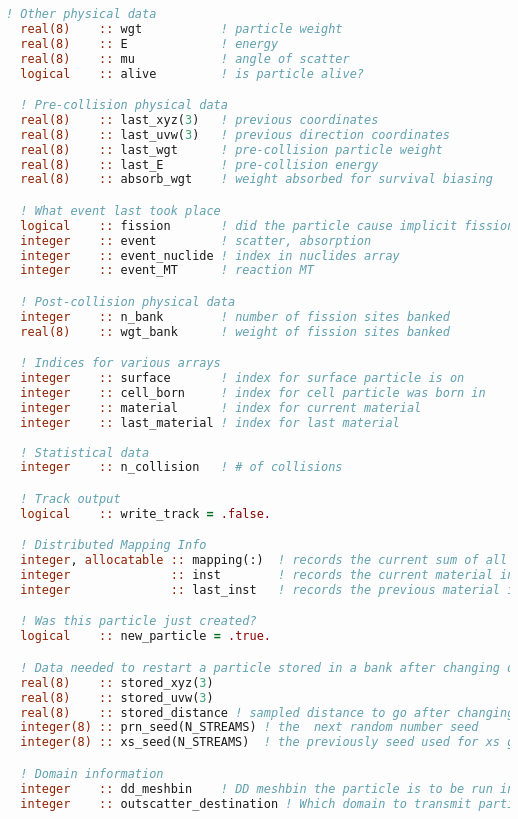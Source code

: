 \begin{appendices}
\begin{lstlisting}[language=Fortran, frame=none, keepspaces=true, frame=single, linewidth=6in, xleftmargin=0.0in,
caption={Full OpenMC particle data structure. \label{lst:particle}}]
  ! Other physical data
  real(8)    :: wgt           ! particle weight
  real(8)    :: E             ! energy
  real(8)    :: mu            ! angle of scatter
  logical    :: alive         ! is particle alive?

  ! Pre-collision physical data
  real(8)    :: last_xyz(3)   ! previous coordinates
  real(8)    :: last_uvw(3)   ! previous direction coordinates
  real(8)    :: last_wgt      ! pre-collision particle weight
  real(8)    :: last_E        ! pre-collision energy
  real(8)    :: absorb_wgt    ! weight absorbed for survival biasing

  ! What event last took place
  logical    :: fission       ! did the particle cause implicit fission
  integer    :: event         ! scatter, absorption
  integer    :: event_nuclide ! index in nuclides array
  integer    :: event_MT      ! reaction MT

  ! Post-collision physical data
  integer    :: n_bank        ! number of fission sites banked
  real(8)    :: wgt_bank      ! weight of fission sites banked

  ! Indices for various arrays
  integer    :: surface       ! index for surface particle is on
  integer    :: cell_born     ! index for cell particle was born in
  integer    :: material      ! index for current material
  integer    :: last_material ! index for last material
  
  ! Statistical data
  integer    :: n_collision   ! # of collisions

  ! Track output
  logical    :: write_track = .false.

  ! Distributed Mapping Info
  integer, allocatable :: mapping(:)  ! records the current sum of all maps
  integer              :: inst        ! records the current material instance
  integer              :: last_inst   ! records the previous material instance

  ! Was this particle just created?
  logical    :: new_particle = .true.

  ! Data needed to restart a particle stored in a bank after changing domains
  real(8)    :: stored_xyz(3)
  real(8)    :: stored_uvw(3)
  real(8)    :: stored_distance ! sampled distance to go after changing domain
  integer(8) :: prn_seed(N_STREAMS) ! the  next random number seed 
  integer(8) :: xs_seed(N_STREAMS)  ! the previously seed used for xs gen

  ! Domain information
  integer    :: dd_meshbin    ! DD meshbin the particle is to be run in next
  integer    :: outscatter_destination ! Which domain to transmit particle to


\end{lstlisting}
\end{appendices}
